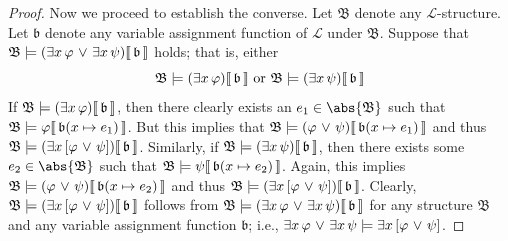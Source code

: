 \begin{proof}
    \vspace{0.3cm}
    \noindent
    Now we proceed to establish the converse.
    Let \( \mathfrak{B} \) denote any \( \mathcal{L} \)-structure.
    Let \( \mathfrak{b} \) denote any variable assignment function of \( \mathcal{L} \) under \( \mathfrak{B} \).
    Suppose that \( \folwffsatisfaction{\mathfrak{B}}{\mleft( \exists x \, \varphi \,\,{\lor}\,\, \exists x \, \psi \mright)}{\mathfrak{b}} \) holds;
    that is, either
    \begin{equation}
        \label{eq:either-exists-x-varphi-or-exists-x-psi}
        \folwffsatisfaction{\mathfrak{B}}{\mleft( \exists x \, \varphi \mright)}{\mathfrak{b}} \ \text{or}
        \ \folwffsatisfaction{\mathfrak{B}}{\mleft( \exists x \, \psi \mright)}{\mathfrak{b}}
    \end{equation}
    If \( \folwffsatisfaction{\mathfrak{B}}{\mleft( \exists x \, \varphi \mright)}{\mathfrak{b}} \), then there clearly exists
    an \( e_{1} \in \abs{\mathfrak{B}} \) such that \( \folwffsatisfaction{\mathfrak{B}}{\varphi}{ \folmodifiedvariableassignmentfunction{\mathfrak{b}}{x}{e_{1}} } \).
    But this implies that
    \( \folwffsatisfaction{\mathfrak{B}}{\mleft( \varphi \,\,{\lor}\,\, \psi \mright)}{ \folmodifiedvariableassignmentfunction{\mathfrak{b}}{x}{e_{1}} } \)
    and thus \( \folwffsatisfaction{\mathfrak{B}}{\mleft( \exists x \, \mleft[ \varphi \,\,{\lor}\,\, \psi \mright] \mright)}{\mathfrak{b}} \).
    Similarly, if \( \folwffsatisfaction{\mathfrak{B}}{\mleft( \exists x \, \psi \mright)}{\mathfrak{b}} \), then there exists some \( e_{2} \in \abs{\mathfrak{B}} \)
    such that \( \folwffsatisfaction{\mathfrak{B}}{\psi}{ \folmodifiedvariableassignmentfunction{\mathfrak{b}}{x}{e_{2}} } \).
    Again, this implies \( \folwffsatisfaction{\mathfrak{B}}{\mleft( \varphi \,\,{\lor}\,\, \psi \mright)}{ \folmodifiedvariableassignmentfunction{\mathfrak{b}}{x}{e_{2}} } \)
    and thus \( \folwffsatisfaction{\mathfrak{B}}{\mleft( \exists x \, \mleft[ \varphi \,\,{\lor}\,\, \psi \mright] \mright)}{\mathfrak{b}} \).
    Clearly, \( \folwffsatisfaction{\mathfrak{B}}{\mleft( \exists x \, \mleft[ \varphi \,\,{\lor}\,\, \psi \mright] \mright)}{\mathfrak{b}} \) follows from
    \( \folwffsatisfaction{\mathfrak{B}}{\mleft( \exists x \, \varphi \,\,{\lor}\,\, \exists x \, \psi \mright)}{\mathfrak{b}} \) for any structure
    \( \mathfrak{B} \) and any variable assignment function \( \mathfrak{b} \);
    i.e., \( \exists x \, \varphi \,\,{\lor}\,\, \exists x \, \psi \models \exists x \, \mleft[ \varphi \,\,{\lor}\,\, \psi \mright] \).
\end{proof}

